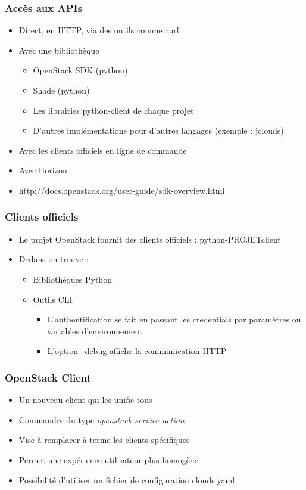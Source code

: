   \begin{frame}
    \frametitle{Accès aux APIs}
    \begin{itemize}
      \item Direct, en HTTP, via des outils comme curl
      \item Avec une bibliothèque
      \begin{itemize}
        \item OpenStack SDK (python)
        \item Shade (python)
        \item Les librairies python-client de chaque projet
        \item D'autres implémentations pour d'autres langages (exemple : jclouds)
      \end{itemize}
      \item Avec les clients officiels en ligne de commande
      \item Avec Horizon
      \item http://docs.openstack.org/user-guide/sdk-overview.html
    \end{itemize}
  \end{frame}

  \begin{frame}
    \frametitle{Clients officiels}
    \begin{itemize}
      \item Le projet OpenStack fournit des clients officiels : python-PROJETclient
      \item Dedans on trouve :
      \begin{itemize}
        \item Bibliothèques Python
        \item Outils CLI
        \begin{itemize}
          \item L'authentification se fait en passant les credentials par paramètres ou variables d'environnement
          \item L'option --debug affiche la communication HTTP
        \end{itemize}
      \end{itemize}
    \end{itemize}
  \end{frame}

  \begin{frame}
    \frametitle{OpenStack Client}
    \begin{itemize}
      \item Un nouveau client qui les unifie tous
      \item Commandes du type \textit{openstack service action}
      \item Vise à remplacer à terme les clients spécifiques
      \item Permet une expérience utilisateur plus homogène
      \item Possibilité d'utiliser un fichier de configuration clouds.yaml
    \end{itemize}
  \end{frame}


